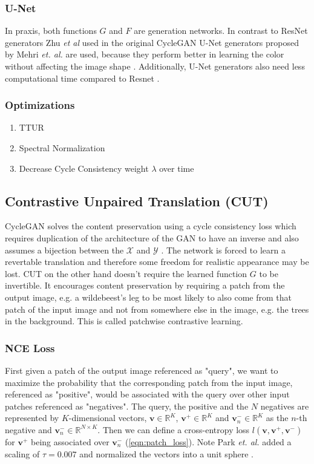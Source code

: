 \documentclass[a4paper,11pt, DIV=12]{scrartcl}
\newcommand{\vp}{\boldsymbol{v}^+}
\newcommand{\vm}{\boldsymbol{v}^-}
\newcommand{\ve}{\boldsymbol{v}}
\begin{document}
\subsubsection*{U-Net}
In praxis, both functions $G$ and $F$ are generation networks. In contrast to ResNet generators \cite{resnet} Zhu \textit{et al} used in the original CycleGAN \cite{cyclegan_orig}
U-Net generators \cite{unet} proposed by Mehri \textit{et. al.} are used, because they perform better in learning the color without affecting the image shape \cite{mehri2019colorizing}.
Additionally, U-Net generators also need less computational time compared to Resnet \cite{mehri2019colorizing}.

\subsubsection*{Optimizations}
\begin{enumerate}
   \item TTUR
   \item Spectral Normalization
   \item Decrease Cycle Consistency weight $\lambda$ over time 
\end{enumerate}


\subsection{Contrastive Unpaired Translation (CUT)}
CycleGAN solves the content preservation using a cycle consistency loss which requires duplication of the architecture 
of the GAN to have an inverse and also assumes a bijection between the $\mathcal{X}$ and $\mathcal{Y}$ \cite{cyclegan_orig}.
The network is forced to learn a revertable translation and therefore some freedom for realistic appearance may be lost. 
CUT on the other hand doesn't require the learned function $G$ to be invertible. 
It encourages content preservation by requiring a patch from the output image, e.g. a wildebeest's leg to be most likely to also come from that patch 
of the input image and not from somewhere else in the image, e.g. the trees in the background. \cite{cut} This is called patchwise contrastive learning. 

\subsubsection*{NCE Loss} %
First given a patch of the output image referenced as "query", we want to maximize the probability that the corresponding 
patch from the input image, referenced as "positive", would be associated with the query over other input patches referenced
as "negatives". 
The query, the positive and the $N$ negatives are represented by $K$-dimensional vectors, $\ve \in \mathbb{R}^K$, $\vp \in \mathbb{R}^K$ 
and $\vm_n \in \mathbb{R}^K$ as the $n$-th negative and $\ve_n^- \in \mathbb{R}^{N \times K}$. 
Then we can define a cross-entropy loss $l(\ve, \vp, \vm)$ for $\vp$ being associated over $\vm_n$ (\autoref{eqn:patch_loss}).
Note Park \textit{et. al.} added a scaling of $\tau = 0.007$ and normalized the vectors into a unit sphere \cite{cut}.
\end{document}
